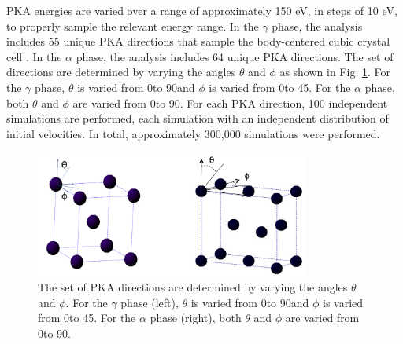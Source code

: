 \documentclass[review]{elsarticle}
\begin{document}
PKA energies are varied over a range of approximately 150 eV, in steps of 10 eV, to properly sample the relevant energy range. In the $\gamma$ phase, the analysis includes 55 unique PKA directions that sample the body-centered cubic crystal cell \cite{beeler2015}. In the $\alpha$ phase, the analysis includes 64 unique PKA directions. The set of directions are determined by varying the angles $\theta$ and $\phi$ as shown in Fig. \ref{fig:directions}. For the $\gamma$ phase, $\theta$ is varied from 0\degree to 90\degree and $\phi$ is varied from 0\degree to 45\degree. For the $\alpha$ phase, both $\theta$ and $\phi$ are varied from 0\degree to 90\degree. For each PKA direction, 100 independent simulations are performed, each simulation with an independent distribution of initial velocities. In total, approximately 300,000 simulations were performed. 

\begin{figure}[h]
 \centering
 \includegraphics[width=0.8\textwidth]{directions.png} 
 \caption{The set of PKA directions are determined by varying the angles $\theta$ and $\phi$. For the $\gamma$ phase (left), $\theta$ is varied from 0\degree to 90\degree and $\phi$ is varied from 0\degree to 45\degree. For the $\alpha$ phase (right), both $\theta$ and $\phi$ are varied from 0\degree to 90\degree.}
 \label{fig:directions}
\end{figure}

\FloatBarrier
\end{document}
